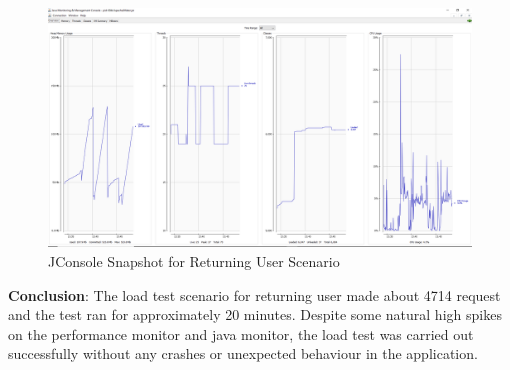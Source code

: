 \documentclass[fontsize=12pt,paper=letter,twoside]{scrartcl}
\begin{document}
\begin{figure}[!htb]
\begin{center}
\includegraphics[width=.7\textwidth]{../../load-test/test-plans/returning-user/jconsole-ru.png}
\end{center}
\caption{JConsole Snapshot for Returning User Scenario}
\label{fig:ruser:jconsole}
\end{figure}

\smallskip
\noindent \textbf{Conclusion}: The load test scenario for returning user made about 4714 request and the test ran for approximately 20 minutes. Despite some natural high spikes on the performance monitor and java monitor, the load test was carried out successfully without any crashes or unexpected behaviour in the application.
\end{document}
